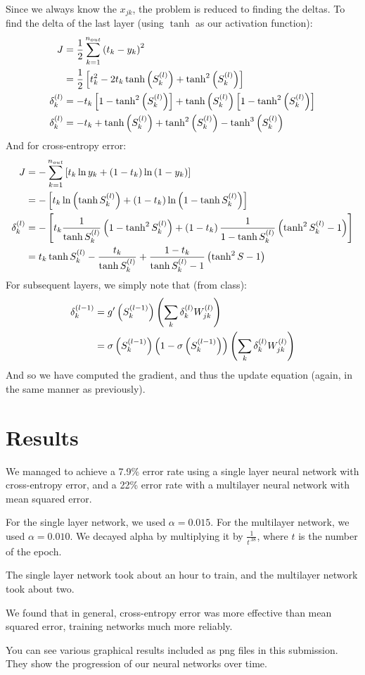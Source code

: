 \documentclass[11pt]{article}
\begin{document}
Since we always know the $x_{jk}$, the problem is reduced to finding the deltas. To find the delta of the last layer (using $\tanh$ as our activation function):
\begin{align}
	J &= \frac{1}{2}\sum_{k=1}^{n_{out}}\left( t_k - y_k \right) ^2 \\
	&= \frac{1}{2}\left[ t_k^2 - 2t_k \tanh \left( S_k^{(l)} \right) + \tanh ^2 \left( S_k^{(l)} \right) \right] \\
	\delta_k^{(l)} &=  - t_k \left[ 1 - \tanh ^2 \left( S_k^{(l)} \right) \right] + \tanh \left( S_k^{(l)} \right) \left[ 1 - \tanh ^2 \left( S_k^{(l)} \right) \right] \\
	\delta_k^{(l)} &= -t_k + \tanh \left( S_k^{(l)} \right) + \tanh ^2 \left( S_k^{(l)} \right) - \tanh ^3 \left( S_k^{(l)} \right) 
\end{align}
And for cross-entropy error:
\begin{align}
	J &= - \sum_{k=1}^{n_{out}}\left[t_k \ln y_k + \left(1- t_k \right)\ln \left( 1- y_k \right) \right] \\
	&= - \left[ t_k \ln \left( \tanh S_k^{(l)} \right) + \left( 1 - t_k \right) \ln \left( 1 - \tanh S_k^{(l)} \right) \right] \\
	\delta_k^{(l)} &= - \left[ t_k \frac{1}{\tanh S_k^{(l)}} \left( 1 - \tanh ^2 S_k^{(l)} \right) + \left( 1 - t_k \right) \frac{1}{1 - \tanh S_k^{(l)}} \left( \tanh ^2 S_k^{(l)} - 1 \right) \right]  \\
	&= t_k \tanh S_k^{(l)} - \frac{t_k}{\tanh S_k^{(l)}} + \frac{1 - t_k}{\tanh S_k^{(l)} - 1} \left( \tanh ^2 S - 1 \right) 
\end{align}
For subsequent layers, we simply note that (from class):
\begin{align*}
\delta_k^{(l-1)} &= g'\left( S_k^{(l-1)} \right) \left( \sum_k \delta_k^{(l)} W_{jk}^{(l)} \right) \\
&= \sigma \left( S_k^{(l-1)} \right) \left( 1 - \sigma \left( S_k^{(l-1)} \right) \right) \left( \sum_k \delta_k^{(l)} W_{jk}^{(l)} \right)
\end{align*}
And so we have computed the gradient, and thus the update equation (again, in the same manner as previously). 

\section{Results}
We managed to achieve a 7.9\% error rate using a single layer neural network with cross-entropy error, and a 22\% error rate with a multilayer neural network with mean squared error.

For the single layer network, we used $\alpha = 0.015$. For the multilayer network, we used $\alpha = 0.010$. We decayed alpha by multiplying it by $\frac{1}{t^{.38}}$, where $t$ is the number of the epoch. 

The single layer network took about an hour to train, and the multilayer network took about two. 

We found that in general, cross-entropy error was more effective than mean squared error, training networks much more reliably. 

You can see various graphical results included as png files in this submission. They show the progression of our neural networks over time. 
\end{document}
